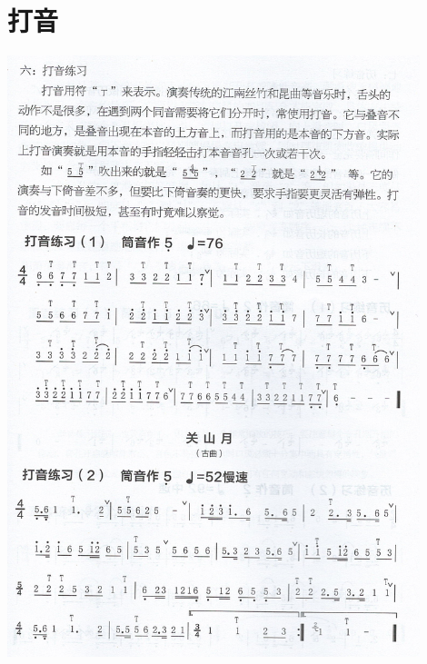 \documentclass[cn,pad,twocol]{elegantbook}
\begin{document}
\section{打音}
    \includegraphics[width=0.9\textwidth]{dongxiao/Scan 12.jpeg}
\end{document}
